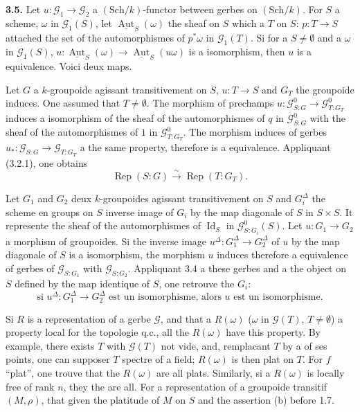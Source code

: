 \documentclass[12pt,a4paper]{article}
\theoremstyle{plain}
\theoremstyle{definition}
\theoremstyle{remark}
\DeclareMathOperator{\Aut}{Aut}
\DeclareMathOperator{\Id}{Id}
\DeclareMathOperator{\Rep}{Rep}
\begin{document}
\subsection{}

\textbf{3.5.} Let $u : \mathcal{G}_1 \to \mathcal{G}_2$ a $(\mathrm{Sch}/k)$-functor between gerbes on $(\mathrm{Sch}/k)$. For $S$ a scheme, $\omega$ in $\mathcal{G}_1(S)$, let $\underline{\Aut}_S(\omega)$ the sheaf on $S$ which a $T$ on $S$: $p : T \to S$ attached the set of the automorphismes of $p^*\omega$ in $\mathcal{G}_1(T)$. Si for a $S \neq \emptyset$ and a $\omega$ in $\mathcal{G}_1(S)$, $u : \underline{\Aut}_S(\omega) \to \underline{\Aut}_S(u\omega)$ is a isomorphism, then $u$ is a equivalence. Voici deux maps.

Let $G$ a $k$-groupoide agissant transitivement on $S$, $u : T \to S$ and $G_T$ the groupoide induces. One assumed that $T \neq \emptyset$. The morphism of prechamps $u : \mathcal{G}^0_{S:G} \to \mathcal{G}^0_{T:G_T}$ induces a isomorphism of the sheaf of the automorphismes of $q$ in $\mathcal{G}^0_{S:G}$ with the sheaf of the automorphismes of $1$ in $\mathcal{G}^0_{T:G_T}$. The morphism induces of gerbes $u_* : \mathcal{G}_{S:G} \to \mathcal{G}_{T:G_T}$ a the same property, therefore is a equivalence. Appliquant (3.2.1), one obtains
\begin{equation}\label{eq:3.5.1}
\Rep(S:G) \xrightarrow{\sim} \Rep(T:G_T).
\end{equation}

Let $G_1$ and $G_2$ deux $k$-groupoides agissant transitivement on $S$ and $G_i^\Delta$ the scheme en groups on $S$ inverse image of $G_i$ by the map diagonale of $S$ in $S \times S$. It represente the sheaf of the automorphismes of $\Id_S$ in $\mathcal{G}^0_{S:G_i}(S)$. Let $u : G_1 \to G_2$ a morphism of groupoides. Si the inverse image $u^\Delta : G_1^\Delta \to G_2^\Delta$ of $u$ by the map diagonale of $S$ is a isomorphism, the morphism $u$ induces therefore a equivalence of gerbes of $\mathcal{G}_{S:G_1}$ with $\mathcal{G}_{S:G_2}$. Appliquant 3.4 a these gerbes and a the object on $S$ defined by the map identique of $S$, one retrouve the $G_i$:
\begin{equation}\label{eq:3.5.2}
\text{si } u^\Delta : G_1^\Delta \to G_2^\Delta \text{ est un isomorphisme, alors } u \text{ est un isomorphisme.}
\end{equation}

Si $R$ is a representation of a gerbe $\mathcal{G}$, and that a $R(\omega)$ ($\omega$ in $\mathcal{G}(T)$, $T \neq \emptyset$) a property local for the topologie q.c., all the $R(\omega)$ have this property. By example, there exists $T$ with $\mathcal{G}(T)$ not vide, and, remplacant $T$ by a of ses points, one can supposer $T$ spectre of a field; $R(\omega)$ is then plat on $T$. For $f$ ``plat'', one trouve that the $R(\omega)$ are all plats. Similarly, si a $R(\omega)$ is locally free of rank $n$, they the are all. For a representation of a groupoide transitif $(M,\rho)$, that given the platitude of $M$ on $S$ and the assertion (b) before 1.7.
\end{document}
